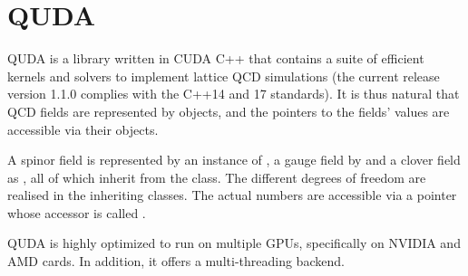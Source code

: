 \chapter{QUDA}
\label{ch:p1:quda}

QUDA \cite{QUDApaper} is a library written in CUDA C++ that contains a suite of efficient kernels and solvers to implement lattice QCD simulations (the current release version 1.1.0 complies with the C++14 and 17 standards). It is thus natural that QCD fields are represented by objects, and the pointers to the fields' values are accessible via their objects.


A spinor field is represented by an instance of , a gauge field by  and a clover field as , all of which inherit from the  class. The different degrees of freedom are realised in the inheriting classes. The actual numbers are accessible via a pointer whose accessor is called .

QUDA is highly optimized to run on multiple GPUs, specifically on NVIDIA and AMD cards. In addition, it offers a multi-threading backend.
